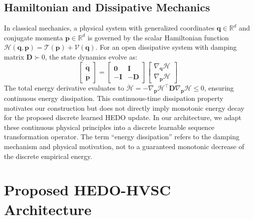 \documentclass[journal]{IEEEtran}
\begin{document}
\subsection{Hamiltonian and Dissipative Mechanics}
In classical mechanics, a physical system with generalized coordinates $\mathbf{q} \in \mathbb{R}^d$ and conjugate momenta $\mathbf{p} \in \mathbb{R}^d$ is governed by the scalar Hamiltonian function $\mathcal{H}(\mathbf{q}, \mathbf{p}) = \mathcal{T}(\mathbf{p}) + \mathcal{V}(\mathbf{q})$. For an open dissipative system with damping matrix $\mathbf{D} \succ 0$, the state dynamics evolve as:
\begin{equation}
\begin{bmatrix} \dot{\mathbf{q}} \\ \dot{\mathbf{p}} \end{bmatrix} = \begin{bmatrix} \mathbf{0} & \mathbf{I} \\ -\mathbf{I} & -\mathbf{D} \end{bmatrix} \begin{bmatrix} \nabla_{\mathbf{q}} \mathcal{H} \\ \nabla_{\mathbf{p}} \mathcal{H} \end{bmatrix}
\end{equation}
The total energy derivative evaluates to $\dot{\mathcal{H}} = -\nabla_{\mathbf{p}}\mathcal{H}^\top \mathbf{D} \nabla_{\mathbf{p}}\mathcal{H} \le 0$, ensuring continuous energy dissipation. This continuous-time dissipation property motivates our construction but does not directly imply monotonic energy decay for the proposed discrete learned HEDO update. In our architecture, we adapt these continuous physical principles into a discrete learnable sequence transformation operator. The term ``energy dissipation'' refers to the damping mechanism and physical motivation, not to a guaranteed monotonic decrease of the discrete empirical energy.

\section{Proposed HEDO-HVSC Architecture}
\label{sec:methodology}
\end{document}
